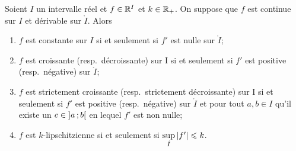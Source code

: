 \begin{theo}
  Soient \(I\) un intervalle réel et \(f \in \mathbb{R}^I\) et \(k \in \mathbb{R}_{+}\). On 
  suppose que \(f\) est continue sur \(I\) et dérivable sur \(\mathring{I}\). 
  Alors
  \begin{enumerate}
    \item \(f\) est constante sur \(I\) si et seulement si \(f'\) est nulle sur 
      \(\mathring{I}\);
    \item \(f\) est croissante (resp.\ décroissante) sur I si et seulement si 
      \(f'\) est positive (resp.\ négative) sur \(\mathring{I}\);
    \item \(f\) est strictement croissante (resp.\ strictement décroissante) sur 
      I si et seulement si \(f'\) est positive (resp.\ négative) sur 
      \(\mathring{I}\) et pour tout \(a,b \in I\) qu'il existe un \(c \in 
      \left] a \, ;  b \right[\) en lequel \(f'\) est non nulle;
    \item \(f\) est \(k\)-lipschitzienne si et seulement si 
      \(\sup\limits_{\mathring{I}} \left\lvert f'\right\rvert \leqslant k\).
  \end{enumerate}
\end{theo}
